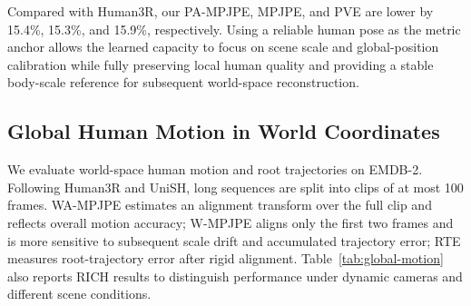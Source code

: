 \documentclass{article}
\begin{document}
Compared with Human3R, our PA-MPJPE, MPJPE, and PVE are lower by 15.4\%, 15.3\%, and 15.9\%, respectively. Using a reliable human pose as the metric anchor allows the learned capacity to focus on scene scale and global-position calibration while fully preserving local human quality and providing a stable body-scale reference for subsequent world-space reconstruction.

\subsection{Global Human Motion in World Coordinates}

We evaluate world-space human motion and root trajectories on EMDB-2. Following Human3R and UniSH, long sequences are split into clips of at most 100 frames. WA-MPJPE estimates an alignment transform over the full clip and reflects overall motion accuracy; W-MPJPE aligns only the first two frames and is more sensitive to subsequent scale drift and accumulated trajectory error; RTE measures root-trajectory error after rigid alignment. Table~\ref{tab:global-motion} also reports RICH results to distinguish performance under dynamic cameras and different scene conditions.
\end{document}
